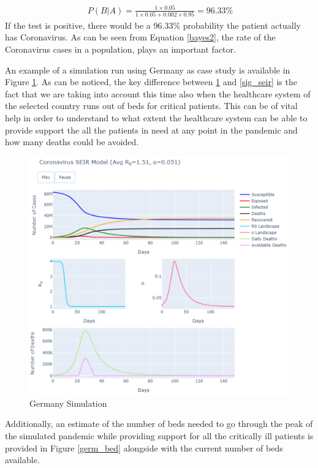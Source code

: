\useshortskip
\begin{align}
\ P(B|A) = \frac{1 \times 0.05}{1 \times 0.05 + 0.002 \times 0.95} = 96.33\%
\end{align}
\useshortskip
If the test is positive, there would be a 96.33\% probability the patient actually has Coronavirus. As can be seen from Equation \ref{bayes2}, the rate of the Coronavirus cases in a population, plays an important factor.

An example of a simulation run using Germany as case study is available in Figure \ref{germ_sim}. As can be noticed, the key difference between \ref{germ_sim} and \ref{sig_seir} is the fact that we are taking into account this time also when the healthcare system of the selected country runs out of beds for critical patients. This can be of vital help in order to understand to what extent the healthcare system can be able to provide support the all the patients in need at any point in the pandemic and how many deaths could be avoided.
\vspace{-0.3cm}
\begin{figure}[ht!]%
    \centering
    \includegraphics[width=0.85\linewidth]{latex/images/cov_g2.pdf}
    \vspace{-0.3cm}
    \caption{Germany Simulation}
    \label{germ_sim}
\end{figure}

Additionally, an estimate of the number of beds needed to go through the peak of the simulated pandemic while providing support for all the critically ill patients is provided in Figure \ref{germ_bed} alongside with the current number of beds available.

